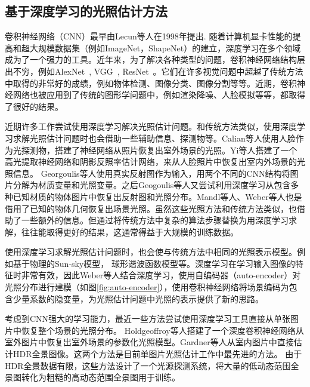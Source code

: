 \subsection{基于深度学习的光照估计方法}
卷积神经网络（CNN）最早由Lecun等人\cite{lecun1998gradient}在1998年提出. 随着计算机显卡性能的提高和超大规模数据集（例如ImageNet\cite{deng2009imagenet}，ShapeNet\cite{chang2015shapenet}）的建立，深度学习在多个领域成为了一个强力的工具。近年来，为了解决各种类型的问题，卷积神经网络结构层出不穷，例如AlexNet~\cite{krizhevsky2012imagenet}, VGG~\cite{simonyan2014very}, ResNet~\cite{he2016deep}。它们在许多视觉问题中超越了传统方法中取得的非常好的成绩，例如物体检测\cite{girshick2014rich}、图像分类\cite{krizhevsky2012imagenet}、图像分割\cite{ronneberger2015u}等等。近期，卷积神经网络也被应用到了传统的图形学问题中，例如渲染降噪\cite{chaitanya2017interactive}、人脸模拟\cite{karras2017audio}等等，都取得了很好的结果。

近期许多工作尝试使用深度学习解决光照估计问题。和传统方法类似，使用深度学习求解光照估计问题时也会借助一些辅助信息、探测物等。Calian等人\cite{calian2018faces}使用人脸作为光探测物，搭建了神经网络从照片恢复出室外场景的光照。Yi等人\cite{yi2018faces}搭建了一个高光提取神经网络和阴影反照率估计网络，来从人脸照片中恢复出室内外场景的光照信息。
Georgoulis等人\cite{georgoulis2016delight}使用真实反射图作为输入，用两个不同的CNN结构将图片分解为材质变量和光照变量。之后Geogoulis等人\cite{georgoulis2016natural}又尝试利用深度学习从包含多种已知材质的物体图片中恢复出反射图和光照分布。Mandl等人\cite{mandl2017learning}、Weber等人\cite{weber2018learning}也是借用了已知的物体几何恢复出场景光照。虽然这些光照方法和传统方法类似，也借助了一些额外的信息。但通过将传统方法中复杂的算法步骤替换为用深度学习求解，往往能取得更好的结果，这通常得益于大规模的训练数据。

使用深度学习求解光照估计问题时，也会使与传统方法中相同的光照表示模型。例如基于物理的Sun-sky模型\cite{hold2017deep}， 球形谐波函数模型\cite{mandl2017learning}等。深度学习在学习输入图像的特征时非常有效，因此Weber等人\cite{weber2018learning}结合深度学习，使用自编码器（auto-encoder）对光照分布进行建模（如图\ref{fig:auto-encoder}），使用卷积神经网络将场景编码为包含少量系数的隐变量，为光照估计问题中光照的表示提供了新的思路。

考虑到CNN强大的学习能力，最近一些方法尝试使用深度学习工具直接从单张图片中恢复整个场景的光照分布。
Holdgeoffroy等人\cite{hold2017deep}搭建了一个深度卷积神经网络从室外图片中恢复出室外场景的参数化光照模型。Gardner等人\cite{gardner2017learning}从室内图片中直接估计HDR全景图像。这两个方法是目前单图片光照估计工作中最先进的方法。
由于HDR全景数据有限，这些方法设计了一个光源探测系统，将大量的低动态范围全景图转化为粗糙的高动态范围全景图用于训练。

